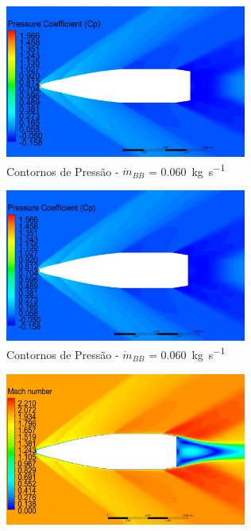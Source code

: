\begin{figure}[!ht]
	\centering
	\begin{subfigure}[b]{0.47\textwidth}
        \centering
        \includegraphics[width=\textwidth,height=5cm]{contorno-pressao-1500K-vazao-0030-2pol.png}
        \caption{Contornos de Pressão - \(\Dot{m}_{BB}\) = \qty{0,060}{\kilogram\per\second}}
        \label{fig:contorno-pressao-bb-1500K-vazao0030}
    \end{subfigure}
    \hfill
    \begin{subfigure}[b]{0.47\textwidth}
        \centering
        \includegraphics[width=\textwidth,height=5cm]{contorno-pressao-1500K-vazao-0060-2pol.png}
        \caption{Contornos de Pressão - \(\Dot{m}_{BB}\) = \qty{0,060}{\kilogram\per\second}}
        \label{fig:contorno-pressao-bb-1500K-vazao0060}
    \end{subfigure}
    \hfill
	\begin{subfigure}[b]{0.47\textwidth}
        \centering
        \includegraphics[width=\textwidth,height=5cm]{contorno-velocidade-1500K-vazao-0030-2pol.png}

\end{subfigure}
\end{figure}
